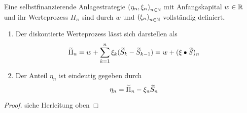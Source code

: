 \begin{lemma} %
	Eine selbstfinanzierende Anlagestrategie $\left( \eta_n, \xi_n \right)_{n \in \mathbb{N}}$ mit Anfangskapital $w \in \mathbb{R}$ und ihr Werteprozess $\Pi_n$ sind durch $w$ und $\left( \xi_n \right)_{n \in \mathbb{N}}$ vollständig definiert. 
	\begin{enumerate}[label=(\alph*), leftmargin=*, nolistsep, topsep=-\parskip]
		\item Der diskontierte Werteprozess lässt sich darstellen als
		\begin{equation*}
		\widetilde{\Pi}_n = w + \sum_{k=1}^n \xi_k (\widetilde{S}_k - \widetilde{S}_{k-1}) = w + (\xi \bullet \widetilde{S})_n
		\end{equation*}
		\item Der Anteil $\eta_n$ ist eindeutig gegeben durch
		\begin{equation*}
		\eta_n = \widetilde{\Pi}_n - \xi_n \widetilde{S}_n
		\end{equation*}
	\end{enumerate}
\end{lemma}
\begin{proof}
	siehe Herleitung oben
\end{proof}
